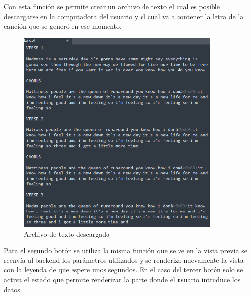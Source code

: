 \documentclass[12pt, a4paper, titlepage]{article}
\begin{document}
	Con esta función se permite crear un archivo de texto el cual es posible descargarse en la computadora del usuario y el cual va a contener la letra de la canción que se generó en ese momento.
	\begin{figure}[H]
		\includegraphics[width=10cm]{./Imagenes/AplicacionWeb/Archivo.png}
		\centering 
		\caption{Archivo de texto descargado}
	\end{figure}	
	Para el segundo botón se utiliza la misma función que se ve en la vista previa se reenvía al backend los parámetros utilizados y se renderiza nuevamente la vista con la leyenda de que espere unos segundos. En el caso del tercer botón solo se activa el estado que permite renderizar la parte donde el usuario introduce los datos.
	\newpage
\end{document}
